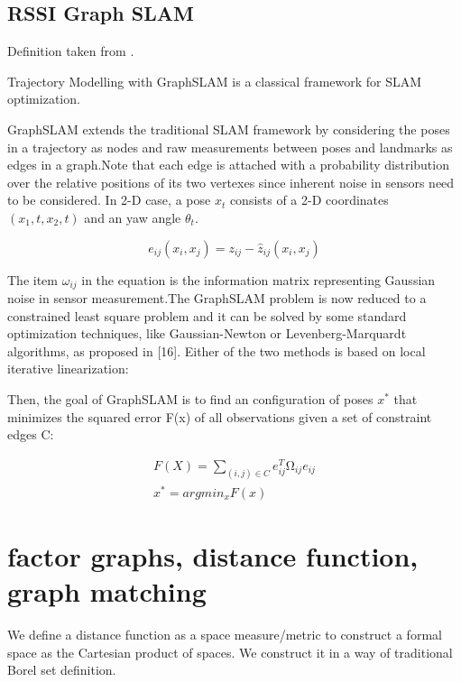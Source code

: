 \documentclass[a4paper, 12pt]{article}
\begin{document}



\subsection{RSSI Graph SLAM}

Definition taken from \cite{7809951}.

Trajectory Modelling with GraphSLAM\cite{SLAM_using_Gaussian_process_latent_variable_models}   is   a   classical   framework   for SLAM optimization.

GraphSLAM  extends  the  traditional  SLAM  framework  by considering  the  poses  in  a  trajectory  as  nodes  and  raw  measurements between poses and landmarks as edges in a graph.Note that each edge is attached with a probability distribution over  the  relative  positions  of  its  two  vertexes  since  inherent noise in sensors need to be considered. In 2-D case, a pose $x_t$ consists of a 2-D coordinates $(x_1,t,x_2,t)$ and an yaw angle $\theta_t$.

\begin{equation}
e_{i j}(x_i, x_j) = z_{i j} - \hat z_{i j} (x_i,x_j)
\end{equation}

The item $\omega_{i j}$ in the equation is the information matrix representing Gaussian noise in sensor measurement.The GraphSLAM problem is now reduced to a constrained least  square  problem  and  it  can  be  solved  by  some  standard optimization techniques, like Gaussian-Newton or Levenberg-Marquardt algorithms, as proposed in [16]. Either of the two methods is based on local iterative linearization: 

Then,  the  goal  of  GraphSLAM  is  to  find  an  configuration of  poses $x^{*}$ that  minimizes  the  squared  error F(x) of  all observations given a set of constraint edges C:

\begin{align}
F(X) =\sum_{(i,j)\in C} e_{i j}^T Ω_{ i j} e_{i j} \\
x^{*} = argmin_x F(x)
\end{align}


\section{factor graphs, distance function, graph matching}

We define a distance function as a space measure/metric to construct a formal space as the Cartesian product of spaces.
We construct it in a way of traditional Borel set definition.
\end{document}
